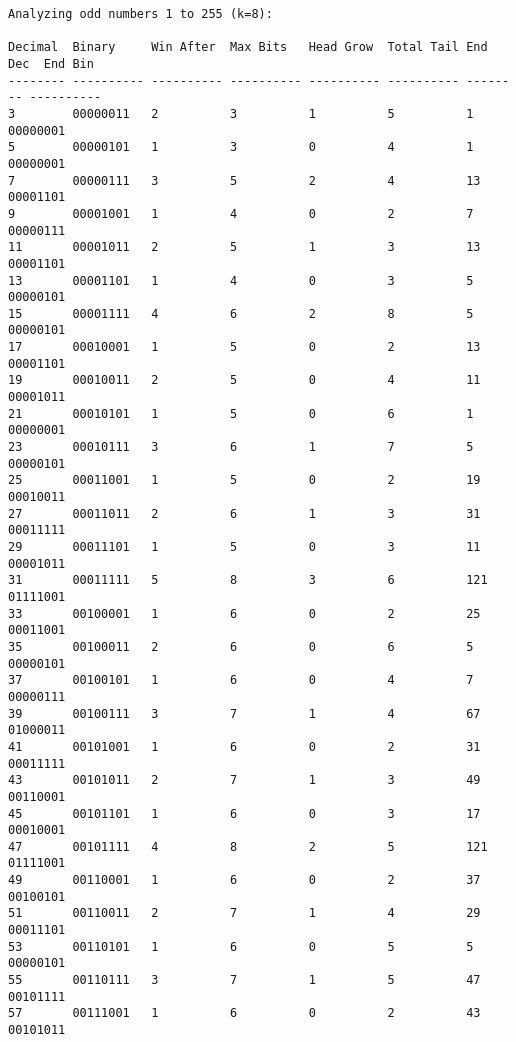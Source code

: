 \documentclass[10pt,letterpaper]{article}
\begin{document}
\begin{lstlisting}
Analyzing odd numbers 1 to 255 (k=8):

Decimal  Binary     Win After  Max Bits   Head Grow  Total Tail End Dec  End Bin   
-------- ---------- ---------- ---------- ---------- ---------- -------- ----------
3        00000011   2          3          1          5          1        00000001  
5        00000101   1          3          0          4          1        00000001  
7        00000111   3          5          2          4          13       00001101  
9        00001001   1          4          0          2          7        00000111  
11       00001011   2          5          1          3          13       00001101  
13       00001101   1          4          0          3          5        00000101  
15       00001111   4          6          2          8          5        00000101  
17       00010001   1          5          0          2          13       00001101  
19       00010011   2          5          0          4          11       00001011  
21       00010101   1          5          0          6          1        00000001  
23       00010111   3          6          1          7          5        00000101  
25       00011001   1          5          0          2          19       00010011  
27       00011011   2          6          1          3          31       00011111  
29       00011101   1          5          0          3          11       00001011  
31       00011111   5          8          3          6          121      01111001  
33       00100001   1          6          0          2          25       00011001  
35       00100011   2          6          0          6          5        00000101  
37       00100101   1          6          0          4          7        00000111  
39       00100111   3          7          1          4          67       01000011  
41       00101001   1          6          0          2          31       00011111  
43       00101011   2          7          1          3          49       00110001  
45       00101101   1          6          0          3          17       00010001  
47       00101111   4          8          2          5          121      01111001  
49       00110001   1          6          0          2          37       00100101  
51       00110011   2          7          1          4          29       00011101  
53       00110101   1          6          0          5          5        00000101  
55       00110111   3          7          1          5          47       00101111  
57       00111001   1          6          0          2          43       00101011  

\end{lstlisting}
\end{document}
